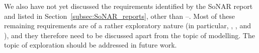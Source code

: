 We also have not yet discussed the requirements identified by the SoNAR report
and listed in Section~\ref{subsec:SoNAR_reports},
other than --.
Most of these remaining requirements are of a rather exploratory nature
(in particular, , , and ),
and they therefore need to be discussed apart from the topic of modelling.
The topic of exploration should be addressed in future work.


